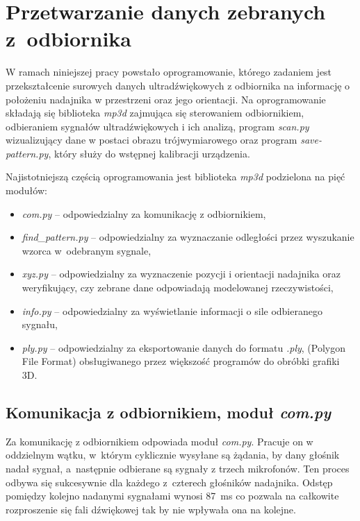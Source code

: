 \chapter{Przetwarzanie danych zebranych z~odbiornika}

W ramach niniejszej pracy powstało oprogramowanie, którego zadaniem jest
przekształcenie surowych danych ultradźwiękowych 
z odbiornika na informację o położeniu nadajnika w przestrzeni oraz jego orientacji.
Na oprogramowanie składają się biblioteka \textit{mp3d} zajmująca się
sterowaniem odbiornikiem, odbieraniem sygnałów ultradźwiękowych i ich analizą, program \textit{scan.py}
wizualizujący dane w postaci obrazu trójwymiarowego oraz program \textit{save-pattern.py},
który służy do wstępnej kalibracji urządzenia.

Najistotniejszą częścią oprogramowania jest biblioteka \textit{mp3d} podzielona na pięć modułów:
\begin{itemize}
 \item \textit{com.py} --  odpowiedzialny za komunikację z odbiornikiem,
 \item \textit{find\_pattern.py} --  odpowiedzialny za wyznaczanie odległości przez wyszukanie wzorca w~odebranym sygnale,
 \item \textit{xyz.py} --  odpowiedzialny za wyznaczenie pozycji i orientacji nadajnika oraz  weryfikujący, 
 czy zebrane dane odpowiadają modelowanej rzeczywistości,
 \item \textit{info.py} --  odpowiedzialny za wyświetlanie informacji o sile odbieranego sygnału,
 \item \textit{ply.py} --  odpowiedzialny za eksportowanie danych do formatu \textit{.ply},
    (Polygon File Format) obsługiwanego przez większość programów do obróbki grafiki 3D.
\end{itemize}


\section{Komunikacja z odbiornikiem, moduł \textit{com.py}}

Za komunikację z odbiornikiem odpowiada moduł \textit{com.py}.
Pracuje on w oddzielnym wątku, w~którym cyklicznie wysyłane są żądania, by dany głośnik nadał sygnał,
a~następnie odbierane są sygnały z trzech mikrofonów.
Ten proces odbywa się sukcesywnie dla każdego z~czterech głośników nadajnika.
Odstęp pomiędzy kolejno nadanymi sygnałami wynosi \SI{87}{ms}
co pozwala na całkowite rozproszenie się fali dźwiękowej tak by nie wpływała ona na kolejne.

